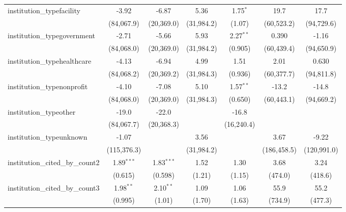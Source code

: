 \begin{tabular}{lcccccc}
   institution\_typefacility             & -3.92        & -6.87        & 5.36          & 1.75$^{*}$    & 19.7        & 17.7\\   
                                         & (84,067.9)   & (20,369.0)   & (31,984.2)    & (1.07)        & (60,523.2)  & (94,729.6)\\   
   institution\_typegovernment           & -2.71        & -5.66        & 5.93          & 2.27$^{**}$   & 0.390       & -1.16\\   
                                         & (84,068.0)   & (20,369.0)   & (31,984.2)    & (0.905)       & (60,439.4)  & (94,650.9)\\   
   institution\_typehealthcare           & -4.13        & -6.94        & 4.99          & 1.51          & 2.01        & 0.630\\   
                                         & (84,068.2)   & (20,369.2)   & (31,984.3)    & (0.936)       & (60,377.7)  & (94,811.8)\\   
   institution\_typenonprofit            & -4.10        & -7.08        & 5.10          & 1.57$^{**}$   & -13.2       & -14.8\\   
                                         & (84,068.0)   & (20,369.0)   & (31,984.3)    & (0.650)       & (60,443.1)  & (94,669.2)\\   
   institution\_typeother                & -19.0        & -22.0        &               & -16.8         &             &   \\   
                                         & (84,067.7)   & (20,368.3)   &               & (16,240.4)    &             &   \\   
   institution\_typeunknown              & -1.07        &              & 3.56          &               & 3.67        & -9.22\\   
                                         & (115,376.3)  &              & (31,984.2)    &               & (186,458.5) & (120,991.0)\\   
   institution\_cited\_by\_count2        & 1.89$^{***}$ & 1.83$^{***}$ & 1.52          & 1.30          & 3.68        & 3.24\\   
                                         & (0.615)      & (0.598)      & (1.21)        & (1.15)        & (474.0)     & (418.6)\\   
   institution\_cited\_by\_count3        & 1.98$^{**}$  & 2.10$^{**}$  & 1.09          & 1.06          & 55.9        & 55.2\\   
                                         & (0.995)      & (1.01)       & (1.70)        & (1.63)        & (734.9)     & (477.3)\\   

\end{tabular}
